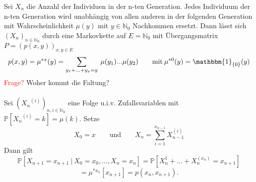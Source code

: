 Sei $X_{n}$ die Anzahl der Individuen in der n-ten Generation. Jedes Individuum der n-ten Generation wird unabhängig von allen anderen in der folgenden Generation mit Wahrscheinlichkeit $\mu(y)$ mit $y \in \mathbb{N}_{0}$ Nachkommen ersetzt. Dann lässt sich $(X_{n})_{n \in \mathbb{N}_{0}}$ durch eine Markovkette auf $E = \mathbb{N}_{0}$ mit Übergangsmatrix $P =(p(x,y))_{x,y \in E}$ 
\begin{equation*}
p(x,y) = \mu^{*x}(y) = \sum_{y_{1} +...+ y_{x} = y} \: \mu(y_{1})... \mu(y_{2}) \qquad \mathrm{mit} \: \mu^{*0}(y) = \mathbbm{1}_{\lbrace 0 \rbrace}(y)
\end{equation*}
\textcolor{red}{Frage?} Woher kommt die Faltung?
\\
\\
Sei $({X_{n}}^{(i)})_{n,i \in \mathbb{N}_{0}}$ eine Folge u.i.v. Zufallsvariablen mit $\mathbb{P}[{X_{n}}^{(i)} = k] = \mu(k)$. Setze
\begin{equation*}
X_{0} = x \qquad  \mathrm{und}  \qquad X_{n} = \sum_{i = 1}^{x_{n-1}} X_{n-1}^{(i)}
\end{equation*}
Dann gilt
\begin{equation*}
\mathbb{P}[X_{n+1} = x_{n+1} \: | \: X_{0} = x_{0},...,X_{n} = x_{n}] = \mathbb{P}[X_{n}^{1}+...+X_{n}^{(x_{n})} = x_{n+1}]
\end{equation*}
\begin{equation*}
= \mu^{*x_{n}}[x_{n+1}] = p(x_{n},x_{n+1}).
\end{equation*}